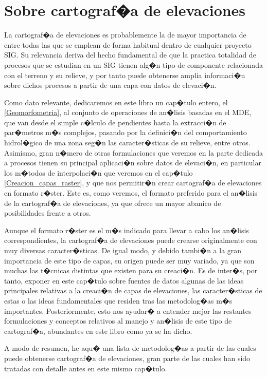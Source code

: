 \section{Sobre cartograf�a de elevaciones}

La cartograf�a de elevaciones es probablemente la de mayor importancia de entre todas las que se emplean de forma habitual dentro de cualquier proyecto SIG. Su relevancia deriva del hecho fundamental de que la practica totalidad de procesos que se estudian en un SIG tienen alg�n tipo de componente relacionada con el terreno y su relieve, y por tanto puede obtenerse amplia informaci�n sobre dichos procesos a partir de una capa con datos de elevaci�n.

Como dato relevante, dedicaremos en este libro un cap�tulo entero, el \ref{Geomorfometria}, al conjunto de operaciones de an�lisis basadas en el MDE, que van desde el simple c�lculo de pendientes hasta la extracci�n de par�metros m�s complejos, pasando por la definici�n del comportamiento hidrol�gico de una zona seg�n las caracter�sticas de su relieve, entre otros. Asimismo, gran n�mero de otras formulaciones que veremos en la parte dedicada a procesos tienen su principal aplicaci�n sobre datos de elevaci�n, en particular los m�todos de interpolaci�n que veremos en el cap�tulo \ref{Creacion_capas_raster}, y que nos permitir�n crear cartograf�a de elevaciones en formato r�ster. Este es, como veremos, el formato preferido para el an�lisis de la cartograf�a de elevaciones, ya que ofrece un mayor abanico de posibilidades frente a otros.

Aunque el formato r�ster es el m�s indicado para llevar a cabo los an�lisis correspondientes, la cartograf�a de elevaciones puede crearse originalmente con muy diversas caracter�sticas. De igual modo, y debido tambi�n a la gran importancia de este tipo de capas, su origen puede ser muy variado, ya que son muchas las t�cnicas distintas que existen para su creaci�n. Es de inter�s, por tanto, exponer en este cap�tulo sobre fuentes de datos algunas de las ideas principales relativas a la creaci�n de capas de elevaciones, las caracter�sticas de estas o las ideas fundamentales que residen tras las metodolog�as m�s importantes. Posteriormente, esto nos ayudar� a entender mejor las restantes formulaciones y conceptos relativos al manejo y an�lisis de este tipo de cartograf�a, abundantes en este libro como ya se ha dicho.

A modo de resumen, he aqu� una lista de metodolog�as a partir de las cuales puede obtenerse cartograf�a de elevaciones, gran parte de las cuales han sido tratadas con detalle antes en este mismo cap�tulo.

